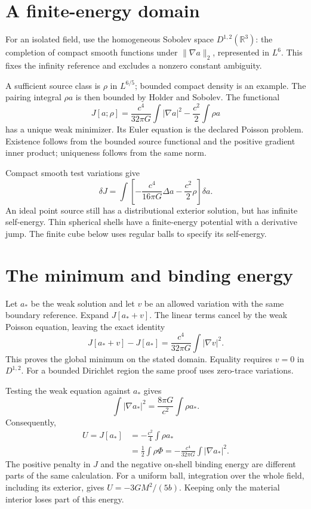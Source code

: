\documentclass[10pt,twocolumn,letterpaper]{article}
\begin{document}
\section{A finite-energy domain}
For an isolated field, use the homogeneous Sobolev space $D^{1,2}(\mathbb R^3)$: the completion of compact smooth functions under $\|\nabla a\|_2$, represented in $L^6$. This fixes the infinity reference and excludes a nonzero constant ambiguity.

A sufficient source class is $\rho$ in $L^{6/5}$; bounded compact density is an example. The pairing integral $\rho a$ is then bounded by Holder and Sobolev. The functional
\[
J[a;\rho]=\frac{c^4}{32\pi G}\int|\nabla a|^2-\frac{c^2}{2}\int\rho a
\]
has a unique weak minimizer. Its Euler equation is the declared Poisson problem. Existence follows from the bounded source functional and the positive gradient inner product; uniqueness follows from the same norm.

Compact smooth test variations give
\[
\delta J=\int\left[-\frac{c^4}{16\pi G}\Delta a-\frac{c^2}{2}\rho\right]\delta a.
\]
An ideal point source still has a distributional exterior solution, but has infinite self-energy. Thin spherical shells have a finite-energy potential with a derivative jump. The finite cube below uses regular balls to specify its self-energy.

\section{The minimum and binding energy}
Let $a_*$ be the weak solution and let $v$ be an allowed variation with the same boundary reference. Expand $J[a_*+v]$. The linear terms cancel by the weak Poisson equation, leaving the exact identity
\[
J[a_*+v]-J[a_*]=\frac{c^4}{32\pi G}\int|\nabla v|^2.
\]
This proves the global minimum on the stated domain. Equality requires $v=0$ in $D^{1,2}$. For a bounded Dirichlet region the same proof uses zero-trace variations.

Testing the weak equation against $a_*$ gives
\[
\int|\nabla a_*|^2=\frac{8\pi G}{c^2}\int\rho a_*.
\]
Consequently,
\[
\begin{aligned}
U=J[a_*]&=-\frac{c^2}{4}\int\rho a_*\\
&=\frac12\int\rho\Phi=-\frac{c^4}{32\pi G}\int|\nabla a_*|^2.
\end{aligned}
\]
The positive penalty in $J$ and the negative on-shell binding energy are different parts of the same calculation. For a uniform ball, integration over the whole field, including its exterior, gives $U=-3GM^2/(5b)$. Keeping only the material interior loses part of this energy.
\end{document}
